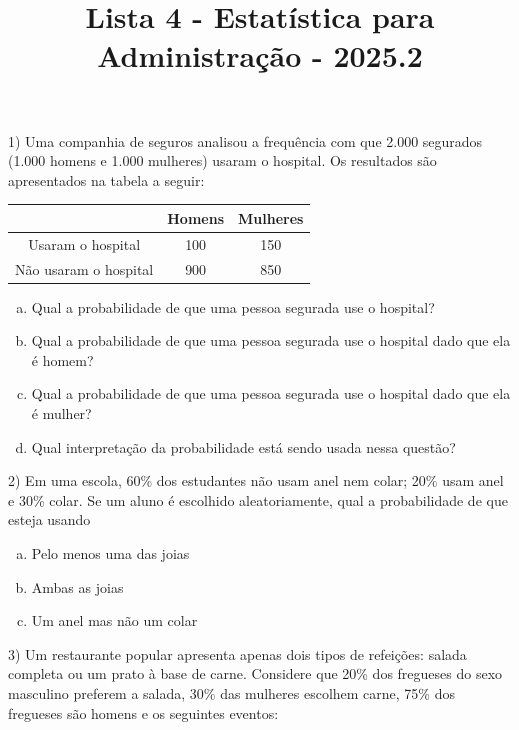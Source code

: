 \documentclass[12pt]{article}
\title{Lista 4 - Estatística para Administração - 2025.2}
\begin{document}
\date{}
\maketitle

1) Uma companhia de seguros analisou a frequência com que 2.000 segurados (1.000 homens e 1.000 mulheres) usaram o hospital. Os resultados são apresentados na tabela a seguir:

\begin{table}[H]
\centering
\begin{tabular}{ccc}
\hline
                      & Homens & Mulheres \\ \hline
Usaram o hospital     & 100    & 150      \\
Não usaram o hospital & 900    & 850      \\ \hline
\end{tabular}
\end{table}

\begin{enumerate}[a)] %
    \item Qual a probabilidade de que uma pessoa segurada use o hospital?
    \item Qual a probabilidade de que uma pessoa segurada use o hospital dado que ela é homem? 
    \item Qual a probabilidade de que uma pessoa segurada use o hospital dado que ela é mulher? 
    \item Qual interpretação da probabilidade está sendo usada nessa questão?
\end{enumerate}

\vspace{5px}

2) Em uma escola, 60\% dos estudantes não usam anel nem colar; 20\% usam anel e 30\%
colar. Se um aluno é escolhido aleatoriamente, qual a probabilidade de que esteja usando

\begin{enumerate}[a)] %
    \item Pelo menos uma das joias
    \item Ambas as joias
    \item Um anel mas não um colar
\end{enumerate}

\vspace{5px}

3) Um restaurante popular apresenta apenas dois tipos de refeições: salada completa ou um prato
à base de carne. Considere que 20\% dos fregueses do sexo masculino preferem a salada, 30\%
das mulheres escolhem carne, 75\% dos fregueses são homens e os seguintes eventos:
\end{document}
